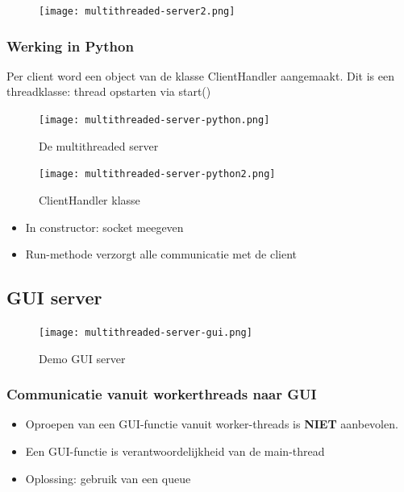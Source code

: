 \documentclass{article}
\begin{document}
\begin{figure}[H]
    \centering
    \texttt{[image: multithreaded-server2.png]}
\end{figure}

\subsubsection{Werking in Python}

Per client word een object van de klasse ClientHandler aangemaakt. 
Dit is een threadklasse: thread opstarten via start()

\begin{figure}[H]
    \centering
    \texttt{[image: multithreaded-server-python.png]}
    \caption{De multithreaded server}
\end{figure}

\begin{figure}[H]
    \centering
    \texttt{[image: multithreaded-server-python2.png]}
    \caption{ClientHandler klasse}
\end{figure}

\begin{itemize}
    \item In constructor: socket meegeven
    \item Run-methode verzorgt alle communicatie met de client
\end{itemize}


\subsection{GUI server}

\begin{figure}[H]
    \centering
    \texttt{[image: multithreaded-server-gui.png]}
    \caption{Demo GUI server}
\end{figure}


\subsubsection{Communicatie vanuit workerthreads naar GUI}

\begin{itemize}
    \item Oproepen van een GUI-functie vanuit worker-threads is \textbf{NIET} aanbevolen.
    \item Een GUI-functie is verantwoordelijkheid van de main-thread
    \item Oplossing: gebruik van een queue
\end{itemize}
\end{document}
